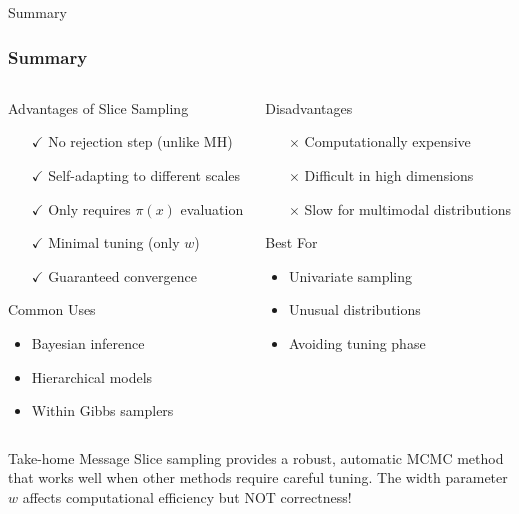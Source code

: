 \documentclass[aspectratio=169]{beamer}
\begin{document}
\begin{frame}{Summary}
	\frametitle{Summary}

	\begin{columns}[T]
		\begin{column}{0.48\textwidth}
			\begin{block}{Advantages of Slice Sampling}
				\begin{itemize}
					\item[$\checkmark$] No rejection step (unlike MH)
					\item[$\checkmark$] Self-adapting to different scales
					\item[$\checkmark$] Only requires $\pi(x)$ evaluation
					\item[$\checkmark$] Minimal tuning (only $w$)
					\item[$\checkmark$] Guaranteed convergence
				\end{itemize}
			\end{block}

			\begin{block}{Common Uses}
				\begin{itemize}
					\item Bayesian inference
					\item Hierarchical models
					\item Within Gibbs samplers
				\end{itemize}
			\end{block}
		\end{column}
		\begin{column}{0.48\textwidth}
			\begin{block}{Disadvantages}
				\begin{itemize}
					\item[$\times$] Computationally expensive
					\item[$\times$] Difficult in high dimensions
					\item[$\times$] Slow for multimodal distributions
				\end{itemize}
			\end{block}

			\begin{block}{Best For}
				\begin{itemize}
					\item Univariate sampling
					\item Unusual distributions
					\item Avoiding tuning phase
				\end{itemize}
			\end{block}
		\end{column}
	\end{columns}

	\vspace{0.5cm}

	\begin{alertblock}{Take-home Message}
		Slice sampling provides a robust, automatic MCMC method that works well when other methods require careful tuning. The width parameter $w$ affects computational efficiency but NOT correctness!
	\end{alertblock}

\end{frame}
\end{document}
